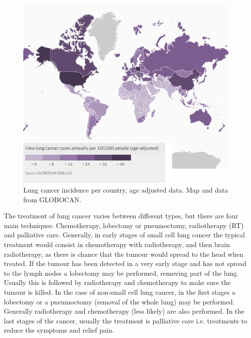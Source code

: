 \begin{figure}[ht]
\begin{center}
\includegraphics[width=0.98\columnwidth]{StateOfArt/worldmap.png}
\caption[Lung cancer incidence in the world]{Lung cancer incidence per country, age adjusted data. Map and data from {GLOBOCAN}\cite{GLOBOCAN2010}.}
\label{fig:world}
\end{center}
\end{figure}



The treatment of lung cancer varies between different types, but there are four main techniques: Chemotherapy, lobectomy or pneumoctomy, radiotherapy (RT) and palliative care. Generally, in early stages of small cell lung cancer the typical treatment would consist in chemotherapy with radiotherapy, and then brain radiotherapy, as there is chance that the tumour would spread to the head when treated. If the tumour has been detected in a very early stage and has not spread to the lymph nodes a lobectomy may be performed, removing part of the lung. Usually this is followed by radiotherapy and chemotherapy to make sure the tumour is killed.
In the case of non-small cell lung cancer, in the first stages a lobectomy or a pneumoctomy (removal of the whole lung) may be performed. Generally radiotherapy and chemotherapy (less likely) are also performed. In the last stages of the cancer, usually the treatment is palliative care i.e. treatments to reduce the symptoms and relief pain\cite{CRUK2014b}.


